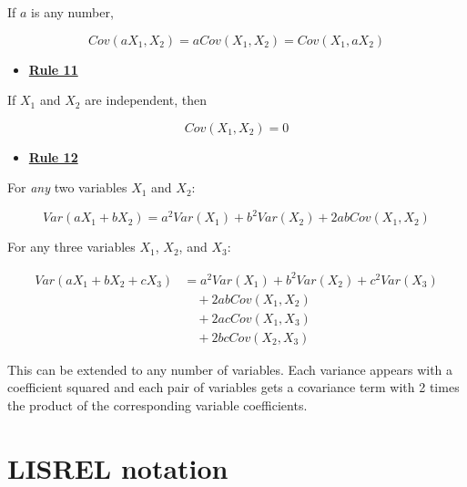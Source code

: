 \documentclass[
]{book}
\providecommand{\tightlist}{%
  \setlength{\itemsep}{0pt}\setlength{\parskip}{0pt}}
\begin{document}
If \(a\) is any number,

\[
Cov\left(a X_{1}, X_{2}\right) = a Cov\left(X_{1}, X_{2}\right) =  Cov\left(X_{1}, a X_{2}\right)  
\]

\begin{itemize}
\tightlist
\item
  \href{./covariance.html\#Rule11}{\textbf{Rule 11}}
\end{itemize}

If \(X_{1}\) and \(X_{2}\) are independent, then

\[
Cov\left(X_{1}, X_{2}\right) = 0
\]

\begin{itemize}
\tightlist
\item
  \href{./covariance.html\#Rule12}{\textbf{Rule 12}}
\end{itemize}

For \emph{any} two variables \(X_{1}\) and \(X_{2}\):

\[
Var(aX_{1} + bX_{2}) = 
    a^2Var(X_{1}) + b^2Var(X_{2}) + 2abCov(X_{1}, X_{2})
\]

For any three variables \(X_{1}\), \(X_{2}\), and \(X_{3}\):

\begin{align}
Var(aX_{1} + bX_{2} + cX_{3}) &= 
    a^2Var(X_{1}) + b^2Var(X_{2}) + c^2Var(X_{3}) \\
    & \quad + 2abCov(X_{1}, X_{2}) \\
    & \quad + 2acCov(X_{1}, X_{3}) \\
    & \quad + 2bcCov(X_{2}, X_{3})
\end{align}

This can be extended to any number of variables. Each variance appears with a coefficient squared and each pair of variables gets a covariance term with 2 times the product of the corresponding variable coefficients.

\hypertarget{appendix-lisrel}{%
\chapter{LISREL notation}\label{appendix-lisrel}}

  
\end{document}
